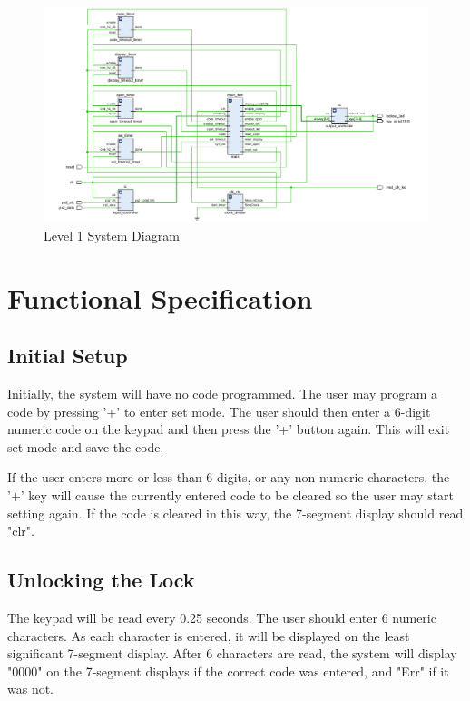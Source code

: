 \documentclass[11pt]{article}
\begin{document}
\begin{figure}[H]
\begin{center}
	\includegraphics[width=\textwidth]{../docs/images/level1.png}
	\caption{\label{fig:level1}Level 1 System Diagram}
\end{center}
\end{figure}

\section{Functional Specification}

\subsection{Initial Setup}

Initially, the system will have no code programmed. The user may program a code by pressing '+' to enter set mode. The user should then enter a 6-digit numeric code on the keypad and then press the '+' button again. This will exit set mode and save the code.

If the user enters more or less than 6 digits, or any non-numeric characters, the '+' key will cause the currently entered code to be cleared so the user may start setting again. If the code is cleared in this way, the 7-segment display should read "clr".

\subsection{Unlocking the Lock}

The keypad will be read every 0.25 seconds. The user should enter 6 numeric characters. As each character is entered,  it will be displayed on the least significant 7-segment display. After 6 characters are read, the system will display "0000" on the 7-segment displays if the correct code was entered, and "Err" if it was not.
\end{document}
